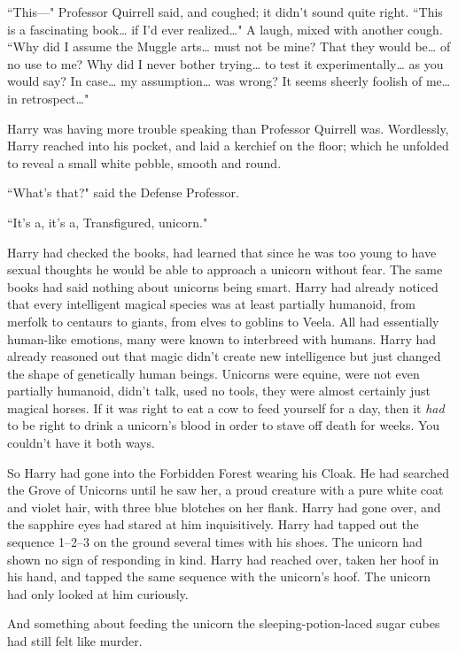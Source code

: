 ``This—" Professor Quirrell said, and coughed; it didn't sound quite right. ``This is a fascinating book{\ldots} if I'd ever realized{\ldots}" A laugh, mixed with another cough. ``Why did I assume the Muggle arts{\ldots} must not be mine? That they would be{\ldots} of no use to me? Why did I never bother trying{\ldots} to test it experimentally{\ldots} as you would say? In case{\ldots} my assumption{\ldots} was wrong? It seems sheerly foolish of me{\ldots} in retrospect{\ldots}"

Harry was having more trouble speaking than Professor Quirrell was. Wordlessly, Harry reached into his pocket, and laid a kerchief on the floor; which he unfolded to reveal a small white pebble, smooth and round.

``What's that?" said the Defense Professor.

``It's a, it's a, Transfigured, unicorn."

Harry had checked the books, had learned that since he was too young to have sexual thoughts he would be able to approach a unicorn without fear. The same books had said nothing about unicorns being smart. Harry had already noticed that every intelligent magical species was at least partially humanoid, from merfolk to centaurs to giants, from elves to goblins to Veela. All had essentially human-like emotions, many were known to interbreed with humans. Harry had already reasoned out that magic didn't create new intelligence but just changed the shape of genetically human beings. Unicorns were equine, were not even partially humanoid, didn't talk, used no tools, they were almost certainly just magical horses. If it was right to eat a cow to feed yourself for a day, then it \emph{had} to be right to drink a unicorn's blood in order to stave off death for weeks. You couldn't have it both ways.

So Harry had gone into the Forbidden Forest wearing his Cloak. He had searched the Grove of Unicorns until he saw her, a proud creature with a pure white coat and violet hair, with three blue blotches on her flank. Harry had gone over, and the sapphire eyes had stared at him inquisitively. Harry had tapped out the sequence 1--2--3 on the ground several times with his shoes. The unicorn had shown no sign of responding in kind. Harry had reached over, taken her hoof in his hand, and tapped the same sequence with the unicorn's hoof. The unicorn had only looked at him curiously.

And something about feeding the unicorn the sleeping-potion-laced sugar cubes had still felt like murder.

